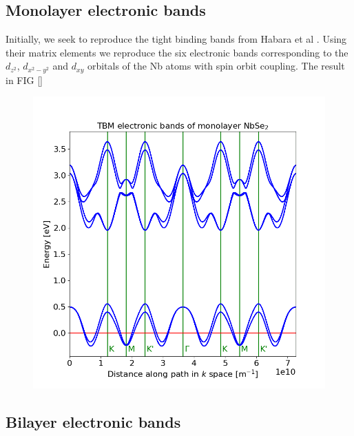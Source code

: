 \documentclass[12pt]{report} %
\begin{document}
\subsection*{Monolayer electronic bands}
Initially, we seek to reproduce the tight binding bands from Habara et al \cite{Habara2021}. Using their matrix elements we reproduce the six electronic bands corresponding to the $d_{z^2}$, $d_{x^2 - y^2}$ and $d_{xy}$ orbitals of the Nb atoms with spin orbit coupling. The result in FIG \ref{}

\begin{figure}[t!]
\centering
  \includegraphics[width=0.75\columnwidth]{monolayer_bands.png}
  \caption{
  }
  \label{monolayer_bands}
\end{figure}

\subsection*{Bilayer electronic bands}
\end{document}
